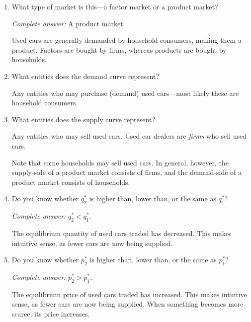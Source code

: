\documentclass[
    letterpaper,paper=portrait,fleqn,
    DIV=16,fontsize=12pt,twoside=semi,
    parskip=full-,
    headings=standardclasses]
{scrartcl}
\begin{document}
\begin{enumerate}
\item What type of market is this---a factor market or a product market?

\begin{solution}
\emph{Complete answer:} A product market.

Used cars are generally demanded by household consumers, making them a product. Factors are bought by firms, whereas products are bought by households.
\end{solution}

\item What entities does the demand curve represent?

\begin{solution}
Any entities who may purchase (demand) used cars---most likely these are household consumers.
\end{solution}

\item What entities does the supply curve represent?

\begin{solution}
Any entities who may sell used cars. Used car dealers are \emph{firms} who sell used cars.

Note that some households may sell used cars. In general, however, the supply-side of a product market consists of firms, and the demand-side of a product market consists of households.
\end{solution}

\item Do you know whether $q^*_2$ is higher than, lower than, or the same as $q^*_1$?

\begin{solution}
\emph{Complete answer:} $q^*_2 < q^*_1$.

The equilibrium quantity of used cars traded has decreased. This makes intuitive sense, as fewer cars are now being supplied.
\end{solution}

\item Do you know whether $p^*_2$ is higher than, lower than, or the same as $p^*_1$?

\begin{solution}
\emph{Complete answer:} $p^*_2 > p^*_1$.

The equilibrium price of used cars traded has increased. This makes intuitive sense, as fewer cars are now being supplied. When something becomes more scarce, its price increases.
\end{solution}

\end{enumerate}
\end{document}
